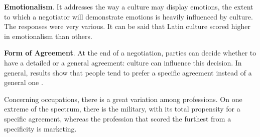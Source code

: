 \documentclass[../main.tex]{subfiles}
\begin{document}
\textbf{Emotionalism}. It addresses the way a culture may display emotions, the extent to which a negotiator will demonstrate emotions is heavily influenced by culture. The responses were very various. It can be said that Latin culture scored higher in emotionalism than others.

\vspace{0.3cm}
\begin{minipage}{\linewidth}
    \label{emotionalismPerCountry.}
\end{minipage}
\vspace{0.3cm}

\textbf{Form of Agreement}. At the end of a negotiation, parties can decide whether to have a detailed or a general agreement: culture can influence this decision. In general, results show that people tend to prefer a specific agreement instead of a general one \autocite[132]{salacuse}. 

\vspace{0.3cm}
\begin{minipage}{\linewidth}
    \label{formAgreementPerCountry}
\end{minipage}
\vspace{0.3cm}

Concerning occupations, there is a great variation among professions. On one extreme of the spectrum, there is the military, with its total propensity for a specific agreement, whereas the profession that scored the furthest from a specificity is marketing.

\vspace{0.3cm}
\begin{minipage}{\linewidth}
    \label{formAgreementPerProfession}
\end{minipage}
\vspace{0.3cm}
\end{document}
